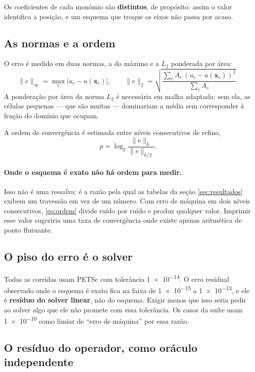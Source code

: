 Os coeficientes de cada monômio são \textbf{distintos}, de propósito: assim o
valor identifica a posição, e um esquema que troque os eixos não passa por acaso.

\subsection{As normas e a ordem}

O erro é medido em duas normas, a do máximo e a $L_2$ ponderada por área:
\begin{equation}
  \|e\|_\infty = \max_c |u_c - u(\mathbf{x}_c)|,
  \qquad
  \|e\|_2 = \sqrt{\frac{\sum_c A_c\,(u_c - u(\mathbf{x}_c))^2}{\sum_c A_c}} .
  \label{eq:normas}
\end{equation}
A ponderação por área da norma $L_2$ é necessária em malha adaptada: sem ela, as
células pequenas --- que são muitas --- dominariam a média sem corresponder à
fração do domínio que ocupam.

A ordem de convergência é estimada entre níveis consecutivos de refino,
\begin{equation}
  p = \log_2 \frac{\|e\|_{h}}{\|e\|_{h/2}} .
  \label{eq:ordem}
\end{equation}

\paragraph{Onde o esquema é exato não há ordem para medir.} Isso não é uma
ressalva: é a razão pela qual as tabelas da seção \ref{sec:resultados} exibem um
travessão em vez de um número. Com erro de máquina em dois níveis consecutivos,
\eqref{eq:ordem} divide ruído por ruído e produz qualquer valor. Imprimir esse
valor sugeriria uma taxa de convergência onde existe apenas aritmética de ponto
flutuante.

\subsection{O piso do erro é o solver}

Todas as corridas usam PETSc com tolerância \num{1e-14}. O erro residual
observado onde o esquema é exato fica na faixa de \num{1e-15} a \num{1e-13}, e
ele é \textbf{resíduo do solver linear}, não do esquema. Exigir menos que isso
seria pedir ao solver algo que ele não promete com essa tolerância. Os casos da
suíte usam \num{1e-10} como limiar de ``erro de máquina'' por essa razão.

\subsection{O resíduo do operador, como oráculo independente}
\label{sec:met-residuo}

